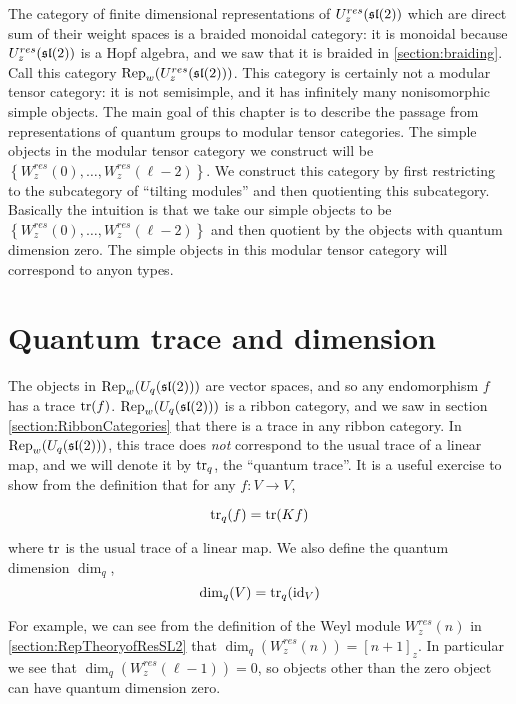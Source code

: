 \label{chapter:MTC}
The category of finite dimensional representations of $U_z^{res}(\mathfrak{sl}(2))$
which are direct sum of their weight spaces is a braided monoidal category: it
is monoidal because $U_z^{res}(\mathfrak{sl}(2))$ is a Hopf algebra, and we saw that it
is braided in \ref{section:braiding}. Call this category
$\operatorname{Rep}_w(U_z^{res}(\mathfrak{sl}(2)))$. This category is certainly not a modular tensor
category: it is not semisimple, and it has infinitely many nonisomorphic simple
objects. The main goal of this chapter is to describe the passage from
representations of quantum groups to modular tensor categories.  The simple
objects in the modular tensor category we construct will be $\left\{
W_z^{res}(0), \ldots, W_z^{res}(\ell-2) \right\}$. We construct this category
by first restricting to the subcategory of ``tilting modules'' and then
quotienting this subcategory. Basically the intuition is that we take our
simple objects to be $\left\{ W_z^{res}(0), \ldots, W_z^{res}(\ell-2) \right\}$
and then quotient by the objects with quantum dimension zero.  The simple
objects in this modular tensor category will correspond to anyon types.



\section{Quantum trace and dimension}

The objects in $\operatorname{Rep}_w(U_q(\mathfrak{sl}(2)))$ are vector spaces, and so any
endomorphism $f$ has a trace $\operatorname{tr}(f)$. $\operatorname{Rep}_w(U_q(\mathfrak{sl}(2)))$ is a ribbon
category, and we saw in section \ref{section:RibbonCategories} that there is a
trace in any ribbon category. In $\operatorname{Rep}_w(U_q(\mathfrak{sl}(2)))$, this trace does
\emph{not} correspond to the usual trace of a linear map, and we will denote it
by $\operatorname{tr}_q$, the ``quantum trace''. It is a useful exercise to show from the
definition that for any $f: V \to V$,

\begin{equation}
\operatorname{tr}_q(f) = \operatorname{tr}(Kf)
\end{equation}

where $\operatorname{tr}$ is the usual trace of a linear map. We also define the quantum
dimension $\dim_q$,
\begin{equation}
\dim_q(V) = \operatorname{tr}_q(\operatorname{id}_V)
\end{equation}

For example, we can see from the definition of the Weyl module $W_z^{res}(n)$
in \ref{section:RepTheoryofResSL2} that $\dim_q(W_z^{res}(n)) = [n+1]_z$. In
particular we see that $\dim_q(W_z^{res}(\ell - 1)) = 0$, so objects other than
the zero object can have quantum dimension zero. 

